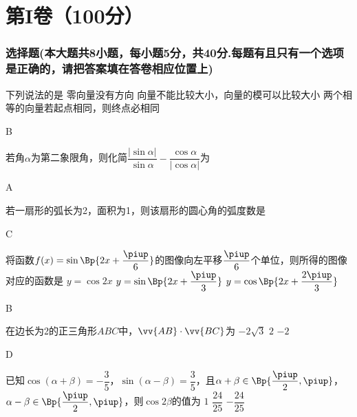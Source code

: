 \part{第I卷（100分）}
\vspace{-3em}
\startexercise
\begin{exercise}
\section{选择题(本大题共8小题，每小题5分，共40分.每题有且只有一个选项是正确的，请把答案填在答卷相应位置上)}
  \item
    下列说法的是\xz
       {零向量没有方向}
       {向量不能比较大小，向量的模可以比较大小}
       {两个相等的向量若起点相同，则终点必相同}
    \begin{answer}
      B
    \end{answer}
  \item
    若角$\alpha$为第二象限角，则化简$\dfrac{|\sin\alpha|}{\sin\alpha}-\dfrac{\cos\alpha}{|\cos\alpha|}$为\xz
    \begin{answer}
      A
    \end{answer}
  \item
    若一扇形的弧长为2，面积为1，则该扇形的圆心角的弧度数是\xz
    \begin{answer}
      C
    \end{answer}
  \item
    将函数$f(x)=\sin\Bp{2x+\dfrac{\piup}6}$的图像向左平移$\dfrac{\piup}6$个单位，则所得的图像对应的函数是\xz
       {$y=\cos{2x}$}
       {$y=\sin\Bp{2x+\dfrac{\piup}3}$}
       {$y=\cos\Bp{2x+\dfrac{2\piup}3}$}
    \begin{answer}
      B
    \end{answer}
  \item
    在边长为2的正三角形$ABC$中，$\vv{AB}\cdot\vv{BC}$为\xz
        {$-2\sqrt3$}
        {$2$}
        {$-2$}
    \begin{answer}
      D
    \end{answer}
  \item
    已知$\cos(\alpha+\beta)=-\dfrac35$，$\sin(\alpha-\beta)=\dfrac35$，且$\alpha+\beta\in\Bp{\dfrac{\piup}2,\piup}$，$\alpha-\beta\in\Bp{\dfrac{\piup}2,\piup}$，则$\cos{2\beta}$的值为\xz
       {$1$}
       {$\dfrac{24}{25}$}
       {$-\dfrac{24}{25}$}
    \begin{answer}

\end{answer}
\end{exercise}
